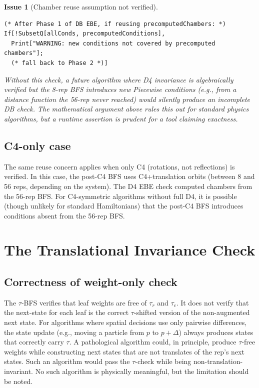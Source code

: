 \documentclass[12pt,a4paper]{article}
\theoremstyle{critical}
\newtheorem{issue}{Issue}
\theoremstyle{remark}
\theoremstyle{verified}
\begin{document}
\begin{issue}[Chamber reuse assumption not verified]
\begin{lstlisting}
(* After Phase 1 of DB EBE, if reusing precomputedChambers: *)
If[!SubsetQ[allConds, precomputedConditions],
  Print["WARNING: new conditions not covered by precomputed chambers"];
  (* fall back to Phase 2 *)]
\end{lstlisting}

Without this check, a future algorithm where D4 invariance is algebraically
verified but the 8-rep BFS introduces new Piecewise conditions (e.g., from a
distance function the 56-rep never reached) would silently produce an incomplete
DB check.  The mathematical argument above rules this out for standard physics
algorithms, but a runtime assertion is prudent for a tool claiming exactness.
\end{issue}

\subsection{C4-only case}

The same reuse concern applies when only C4 (rotations, not reflections) is
verified.  In this case, the post-C4 BFS uses C4+translation orbits (between 8
and 56 reps, depending on the system).  The D4 EBE check computed chambers from
the 56-rep BFS.  For C4-symmetric algorithms without full D4, it is possible
(though unlikely for standard Hamiltonians) that the post-C4 BFS introduces
conditions absent from the 56-rep BFS.

\section{The Translational Invariance Check}
\label{sec:tau}

\subsection{Correctness of weight-only check}

The $\tau$-BFS verifies that leaf weights are free of $\tau_r$ and $\tau_c$.  It
does not verify that the next-state for each leaf is the correct $\tau$-shifted
version of the non-augmented next state.  For algorithms where spatial decisions
use only pairwise differences, the state update (e.g., moving a particle from
$p$ to $p + \Delta$) always produces states that correctly carry $\tau$.  A
pathological algorithm could, in principle, produce $\tau$-free weights while
constructing next states that are not translates of the rep's next states.  Such
an algorithm would pass the $\tau$-check while being non-translation-invariant.
No such algorithm is physically meaningful, but the limitation should be noted.
\end{document}
